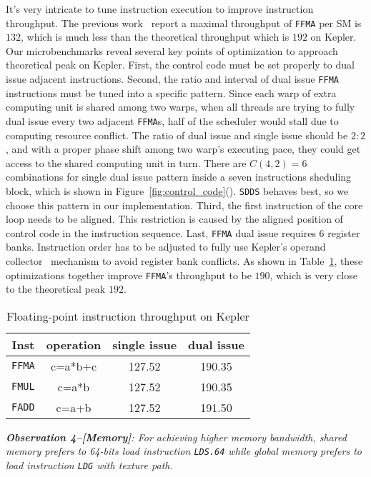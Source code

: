 It's very intricate to tune instruction execution to improve instruction throughput. The previous work~\cite{lai} 
report a maximal throughput of {\tt FFMA} per SM is $132$, which is much less than the theoretical throughput which is 
$192$ on Kepler. Our microbenchmarks reveal several key points of optimization to approach theoretical peak on Kepler. 
First, the control code must be set properly to dual issue adjacent instructions. Second, the ratio and interval of 
dual issue {\tt FFMA} instructions must be tuned into a specific pattern. Since each warp of extra computing unit is 
shared among two warps, when all threads are trying to fully dual issue every two adjacent {\tt FFMA}s, half of the 
scheduler would stall due to computing resource conflict. The ratio of dual issue and single issue should be $2:2$, and 
with a proper phase shift among two warp's executing pace, they could get access to the shared computing unit in turn. 
There are $C(4,2)=6$ combinations for single dual issue pattern inside a seven instructions sheduling block, which is 
shown in Figure~\ref{fig:control_code}(). {\tt SDDS} behaves best, so we choose this 
pattern in our implementation. Third, the first instruction of the core loop needs to be aligned. This restriction is 
caused by the aligned position of control code in the instruction sequence. Last, {\tt FFMA} dual issue requires 6 
register banks. Instruction order has to be adjusted to fully use Kepler's operand 
collector~\cite{collector,tarjan2012policy} mechanism to avoid register bank conflicts. As shown in 
Table~\ref{tab:ffma}, these optimizations together improve {\tt FFMA}'s throughput  to be $190$, which is very close to 
the theoretical peak $192$.

\begin{table}[htbp]
\caption{Floating-point instruction throughput on Kepler}
\centering
\scalebox{1.} {
\begin{tabular}{|c||c|c|c|}
\hline
Inst &operation&single issue&dual issue\\
\hline
{\tt FFMA} &c=a*b+c&127.52&190.35 \\
\hline
{\tt FMUL} &c=a*b&127.52&190.35 \\
\hline
{\tt FADD} &c=a+b&127.52&191.50\\
\hline
\end{tabular}
}
\label{tab:ffma}
\end{table}


{\em {\bf Observation 4--[Memory]}: For achieving higher memory bandwidth, shared memory prefers to 64-bits load 
instruction {\tt LDS.64} while global memory prefers to load instruction {\tt LDG} with texture path.}

